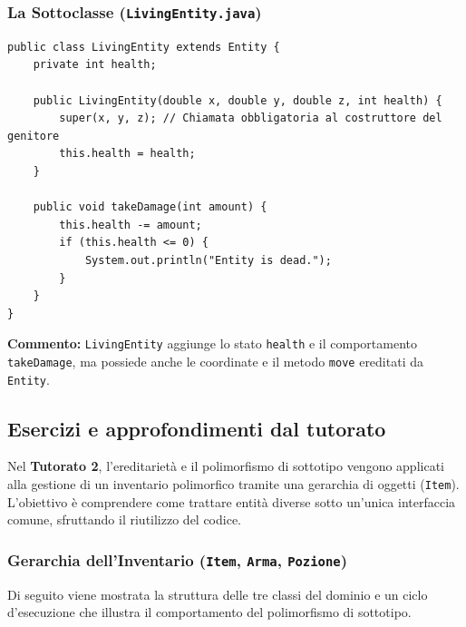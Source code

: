 \documentclass[12pt, a4paper]{article}
\begin{document}
\newpage

\subsubsection{La Sottoclasse (\texttt{LivingEntity.java})}
\begin{verbatim}
public class LivingEntity extends Entity {
    private int health;

    public LivingEntity(double x, double y, double z, int health) {
        super(x, y, z); // Chiamata obbligatoria al costruttore del genitore
        this.health = health;
    }

    public void takeDamage(int amount) {
        this.health -= amount;
        if (this.health <= 0) {
            System.out.println("Entity is dead.");
        }
    }
}
\end{verbatim}
\textbf{Commento:} \texttt{LivingEntity} aggiunge lo stato \texttt{health} e il comportamento \texttt{takeDamage}, ma possiede anche le coordinate e il metodo \texttt{move} ereditati da \texttt{Entity}.
\subsection{Esercizi e approfondimenti dal tutorato}
Nel \textbf{Tutorato 2}, l'ereditarietà e il polimorfismo di sottotipo vengono applicati alla gestione di un inventario polimorfico tramite una gerarchia di oggetti (\texttt{Item}). L'obiettivo è comprendere come trattare entità diverse sotto un'unica interfaccia comune, sfruttando il riutilizzo del codice.

\subsubsection{Gerarchia dell'Inventario (\texttt{Item}, \texttt{Arma}, \texttt{Pozione})}
Di seguito viene mostrata la struttura delle tre classi del dominio e un ciclo d'esecuzione che illustra il comportamento del polimorfismo di sottotipo.

\newpage
\end{document}
